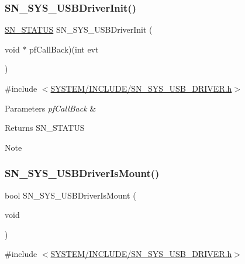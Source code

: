 \subsubsection{\texorpdfstring{S\+N\+\_\+\+S\+Y\+S\+\_\+\+U\+S\+B\+Driver\+Init()}{SN\_SYS\_USBDriverInit()}}
{\footnotesize\ttfamily \hyperlink{group__SYSTEM__ERROR_ga4540713b9a7a18ce44d78c3a10f7442f}{S\+N\+\_\+\+S\+T\+A\+T\+US} S\+N\+\_\+\+S\+Y\+S\+\_\+\+U\+S\+B\+Driver\+Init (\begin{DoxyParamCaption}\item[{void $\ast$}]{pf\+Call\+Back)(int evt }\end{DoxyParamCaption})}



{\ttfamily \#include $<$\hyperlink{SN__SYS__USB__DRIVER_8h}{S\+Y\+S\+T\+E\+M/\+I\+N\+C\+L\+U\+D\+E/\+S\+N\+\_\+\+S\+Y\+S\+\_\+\+U\+S\+B\+\_\+\+D\+R\+I\+V\+E\+R.\+h}$>$}


\begin{DoxyParams}{Parameters}
{\em pf\+Call\+Back} & \\
\hline
\end{DoxyParams}
\begin{DoxyReturn}{Returns}
S\+N\+\_\+\+S\+T\+A\+T\+US 
\end{DoxyReturn}
\begin{DoxyNote}{Note}

\end{DoxyNote}
\mbox{\label{group__SYSTEM__USB__DRIVER_gaccafd3f2c96104a41f768f05a083226f}} 
\subsubsection{\texorpdfstring{S\+N\+\_\+\+S\+Y\+S\+\_\+\+U\+S\+B\+Driver\+Is\+Mount()}{SN\_SYS\_USBDriverIsMount()}}
{\footnotesize\ttfamily bool S\+N\+\_\+\+S\+Y\+S\+\_\+\+U\+S\+B\+Driver\+Is\+Mount (\begin{DoxyParamCaption}\item[{void}]{ }\end{DoxyParamCaption})}



{\ttfamily \#include $<$\hyperlink{SN__SYS__USB__DRIVER_8h}{S\+Y\+S\+T\+E\+M/\+I\+N\+C\+L\+U\+D\+E/\+S\+N\+\_\+\+S\+Y\+S\+\_\+\+U\+S\+B\+\_\+\+D\+R\+I\+V\+E\+R.\+h}$>$}


